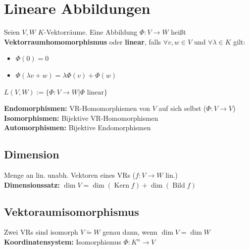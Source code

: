 \documentclass[german, fourcolumn, 8pt]{latex4ei/latex4ei_sheet}
\DeclareMathOperator{\Kern}{Kern}
\DeclareMathOperator{\Bild}{Bild}
\begin{document}
\section{Lineare Abbildungen}
Seien $V,W$ $K$-Vektorräume. Eine Abbildung $\Phi:V\rightarrow W$ heißt \textbf{Vektorraumhomomorphismus} oder \textbf{linear}, falls $\forall v,w \in V$ und $\forall \lambda \in K$ gilt:
\begin{itemize}
    \item $\Phi(0)=0$
    \item $\Phi(\lambda v + w) = \lambda\Phi(v) + \Phi(w)$
\end{itemize}
$L(V,W):=\{\Phi: V \rightarrow W | \Phi \text{ linear} \}$

\begin{sectionbox}
    \textbf{Endomorphismen: }VR-Homomorphismen von $V$ auf sich selbst ($\Phi:V\rightarrow V$) \\
    \textbf{Isomorphismen: }Bijektive VR-Homomorphismen\\
    \textbf{Automorphismen: }Bijektive Endomorphismen\\
\end{sectionbox}

\begin{sectionbox}
    \subsection{Dimension}
    Menge an lin. unabh. Vektoren eines VRs ($f: V\rightarrow W$ lin.)\\
    \textbf{Dimensionssatz:} $\dim V = \dim(\Kern f) + \dim(\Bild f)$
\end{sectionbox}

\begin{sectionbox}
    \subsection{Vektoraumisomorphismus}
    Zwei VRs sind isomorph $V \tilde{=} W$ genau dann, wenn $\dim V = \dim W$\\
    \textbf{Koordinatensystem:} Isomorphismus $\Phi:K^n \rightarrow V$
\end{sectionbox}
\end{document}
